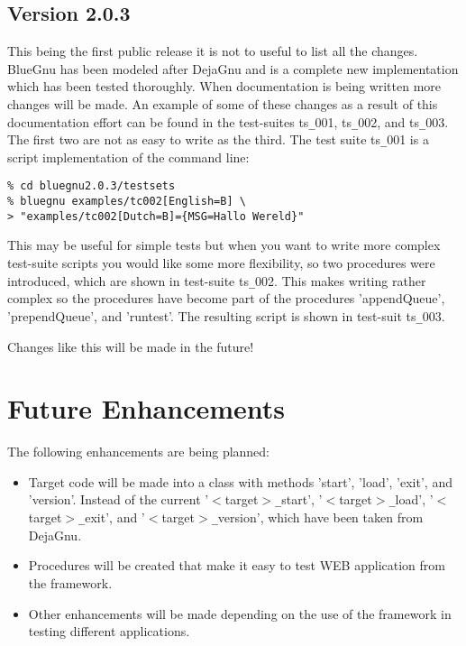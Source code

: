 \subsection{Version 2.0.3}
This being the first public release it is not to useful to list all
the changes. BlueGnu has been modeled after DejaGnu and is a complete
new implementation which has been tested thoroughly. When
documentation is being written more changes will be made. An example
of some of these changes as a result of this documentation effort can
be found in the test-suites ts\verb+_+001, ts\verb+_+002, and
ts\verb+_+003. The first two are not as easy to write as the
third. The test suite ts\verb+_+001 is a script implementation of the
command line:
\begin{verbatim}
% cd bluegnu2.0.3/testsets
% bluegnu examples/tc002[English=B] \
> "examples/tc002[Dutch=B]={MSG=Hallo Wereld}"
\end{verbatim}
This may be useful for simple tests but when you want to write more
complex test-suite scripts you would like some more flexibility, so two
procedures were introduced, which are shown in test-suite ts\verb+_+002. This
makes writing rather complex so the procedures have become part of
the procedures 'appendQueue', 'prependQueue', and 'runtest'. The
resulting script is shown in test-suit ts\verb+_+003.

Changes like this will be made in the future!

\section{Future Enhancements}
The following enhancements are being planned:
\begin{itemize}
\item Target code will be made into a class with methods 'start',
'load', 'exit', and 'version'. Instead of the current
'$<$target$>$\verb+_+start', '$<$target$>$\verb+_+load', '$<$target$>$\verb+_+exit', and
'$<$target$>$\verb+_+version', which have been taken from DejaGnu.

\item Procedures will be created that make it easy to test WEB
application from the framework.

\item Other enhancements will be made depending on the use of the
framework in testing different applications.
\end{itemize}

